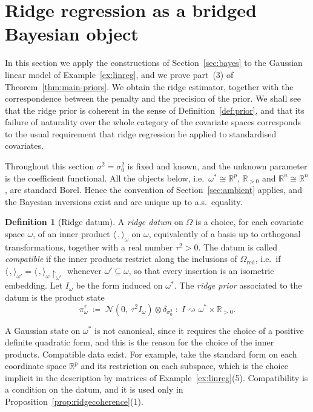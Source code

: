 \documentclass[11pt,a4paper]{article}
\theoremstyle{plain}
\theoremstyle{definition}
\newtheorem{definition}[theorem]{Definition}
\theoremstyle{remark}
\newcommand{\cat}[1]{\mathsf{#1}}
\newcommand{\catO}{\cat{\Omega}}
\newcommand{\R}{\mathbb{R}}
\newcommand{\Norm}{\mathcal{N}}
\begin{document}
\section{Ridge regression as a bridged Bayesian object}\label{sec:ridge}

In this section we apply the constructions of Section~\ref{sec:bayes} to the
Gaussian linear model of Example~\ref{ex:linreg}, and we prove part~(3) of
Theorem~\ref{thm:main-priors}. We obtain the ridge estimator, together with
the correspondence between the penalty and the precision of the prior. We
shall see that the ridge prior is coherent in the sense of
Definition~\ref{def:prior}, and that its failure of naturality over the whole
category of the covariate spaces corresponds to the usual requirement that
ridge regression be applied to standardised covariates.

Throughout this section $\sigma^{2} = \sigma_{0}^{2}$ is fixed and known, and
the unknown parameter is the coefficient functional. All the objects below,
i.e.\ $\omega^{*} \cong \R^{p}$, $\R_{>0}$ and $\R^{u} \cong \R^{n}$, are
standard Borel. Hence the convention of Section~\ref{sec:ambient} applies, and
the Bayesian inversions exist and are unique up to a.s.\ equality.

\begin{definition}[Ridge datum]\label{def:ridge}
A \emph{ridge datum} on $\catO$ is a choice, for each covariate space
$\omega$, of an inner product $\langle\,,\rangle_{\omega}$ on $\omega$,
equivalently of a basis up to orthogonal transformations, together with a real
number $\tau^{2} > 0$. The datum is called \emph{compatible} if the inner
products restrict along the inclusions of $\catO_{\mathrm{red}}$, i.e.\ if
$\langle\,,\rangle_{\omega'} =
\langle\,,\rangle_{\omega}\restriction_{\omega'}$ whenever
$\omega' \subseteq \omega$, so that every insertion is an isometric embedding.
Let $I_{\omega}$ be the form induced on $\omega^{*}$. The \emph{ridge prior}
associated to the datum is the product state
\[
\pi^{\tau}_{\omega}
\;\coloneqq\;
\Norm(0,\ \tau^{2} I_{\omega}) \otimes \delta_{\sigma_{0}^{2}}
\;\colon\; I \rightsquigarrow \omega^{*} \times \R_{>0} .
\]
\end{definition}

A Gaussian state on $\omega^{*}$ is not canonical, since it requires the choice
of a positive definite quadratic form, and this is the reason for the choice of
the inner products. Compatible data exist. For example, take the standard form
on each coordinate space $\R^{p}$ and its restriction on each subspace, which
is the choice implicit in the description by matrices of
Example~\ref{ex:linreg}(5). Compatibility is a condition on the datum, and it
is used only in Proposition~\ref{prop:ridgecoherence}(1).
\end{document}
